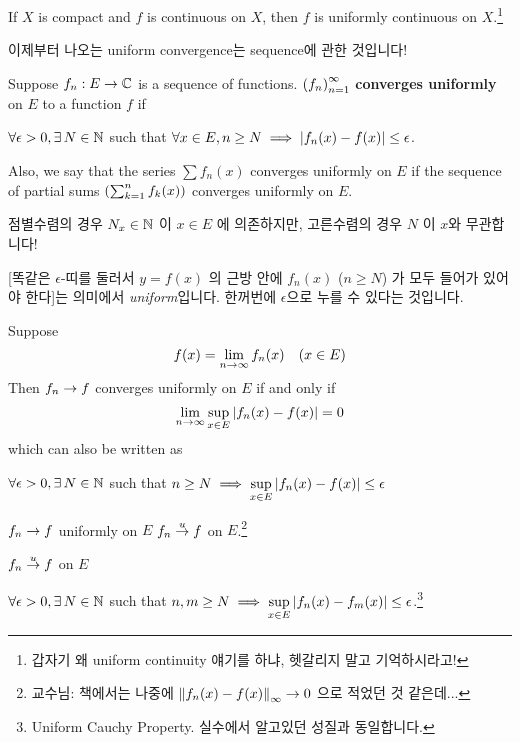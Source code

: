 \recall {} If \(X\) is compact and \(f\) is continuous on \(X\), then \(f\) is uniformly continuous on \(X\).\footnote{갑자기 왜 uniform continuity 얘기를 하냐, 헷갈리지 말고 기억하시라고!}

이제부터 나오는 uniform convergence는 sequence에 관한 것입니다!

  Suppose \(f_n: E \rightarrow \mathbb{C}\) is a sequence of functions. \(\left( f_n \right)_{n=1}^\infty\) \textbf{converges uniformly} on \(E\) to a function \(f\) if
\begin{center}
    \(\forall \epsilon > 0, \exists N\in\N\) such that \(\forall x \in E, n\geq N \implies \left| f_n(x) - f(x) \right| \leq \epsilon\).
\end{center}
Also, we say that the series \(\sum f_n(x)\) converges uniformly on \(E\) if the sequence of partial sums \(\left( \sum_{k=1}^n f_k(x) \right)\) converges uniformly on \(E\).

점별수렴의 경우 \(N_x \in \mathbb{N}\) 이 \(x \in E\) 에 의존하지만, 고른수렴의 경우 \(N\) 이 \(x\)와 무관합니다!

[똑같은 \(\epsilon\)-띠를 둘러서 \(y = f(x)\) 의 근방 안에 \(f_n(x)\) (\(n \geq N\)) 가 모두 들어가 있어야 한다]는 의미에서 \textit{uniform}입니다. 한꺼번에 \(\epsilon\)으로 누를 수 있다는 것입니다.

 Suppose
\[
    f(x) = \lim_{n \rightarrow \infty} f_n(x) \quad (x \in E)
\]
Then \(f_n \rightarrow f\) converges uniformly on \(E\) if and only if
\[
    \lim_{n \rightarrow \infty} \sup_{x \in E} \left| f_n(x) - f(x) \right| = 0
\]
which can also be written as
\begin{center}
    \(\forall \epsilon > 0, \exists N\in \N\) such that \(\displaystyle n \geq N \implies \sup_{x \in E} \left| f_n(x) - f(x) \right| \leq \epsilon\)
\end{center}

\notation \(f_n \rightarrow f\) uniformly on \(E\) \miff \(f_n \overset{u}{\rightarrow} f\) on \(E\).\footnote{교수님: 책에서는 나중에 \(\left\lVert f_n(x) - f(x) \right\rVert_\infty \rightarrow 0\) 으로 적었던 것 같은데...}

 
\(f_n \overset{u}{\rightarrow} f\) on \(E\) \miff
\begin{center}
    \(\forall \epsilon > 0, \exists N \in \N\) such that \(n, m \geq N \implies \displaystyle \sup_{x \in E} \left| f_n(x) - f_m(x) \right| \leq \epsilon\).\footnote{Uniform Cauchy Property. 실수에서 알고있던 성질과 동일합니다.}
\end{center}

